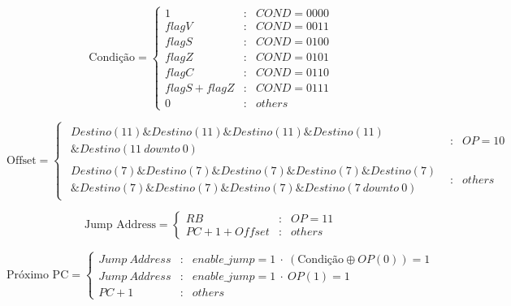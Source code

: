 \[\text{Condição}=\left\{
\begin{array}{rcl}
1 & : & COND=0000\\
flagV & : & COND=0011\\
flagS & : & COND=0100\\
flagZ & : & COND=0101\\
flagC & : &  COND=0110\\
flagS+flagZ & : & COND=0111\\
0 & : & others
\end{array}\right.\]

\[\text{Offset}=\left\{
\begin{array}{rcl}
\begin{array}{r}
Destino(11) \&Destino(11) \&Destino(11) \&Destino(11)\\
\&Destino(11\ downto\ 0)
\end{array} & : & OP=10\\
\begin{array}{r}
Destino(7)\&Destino(7)\&Destino(7)\&Destino(7)\&Destino(7)\\
\&Destino(7)\&Destino(7)\&Destino(7)\&Destino(7\ downto\ 0)
\end{array} & : & others
\end{array}\right.\]

\[\text{Jump Address}=\left\{
\begin{array}{rcl}
RB & : & OP=11\\
PC+1+Offset & : & others
\end{array}\right.\]

\[\text{Próximo PC}=\left\{
\begin{array}{rcl}
Jump\ Address & : & enable\_jump=1\ \cdot\ (\text{Condição} \oplus OP(0))=1\\
Jump\ Address & : & enable\_jump=1\ \cdot\ OP(1)=1\\
PC+1 & : & others
\end{array}\right.\]
